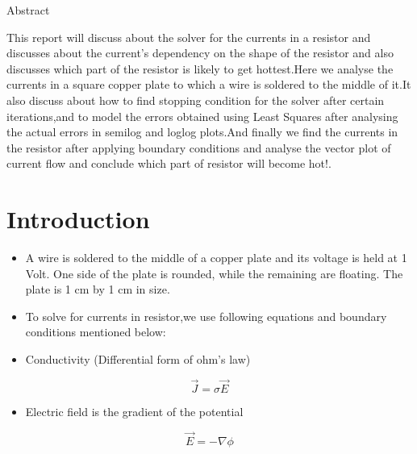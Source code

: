 \documentclass[11pt]{article}
\title{}
\author{
  \textbf{Name}: Rohithram R\\
  \textbf{Roll Number}: EE16B031
}
\providecommand{\tightlist}{%
      \setlength{\itemsep}{0pt}\setlength{\parskip}{0pt}}
\begin{document}
    
    
    \maketitle
    
    

    
	
		
    Abstract

 This report will discuss about the solver for the currents in a
resistor and discusses about the current's dependency on the shape of
the resistor and also discusses which part of the resistor is likely to
get hottest.Here we analyse the currents in a square copper plate to
which a wire is soldered to the middle of it.It also discuss about how
to find stopping condition for the solver after certain iterations,and
to model the errors obtained using Least Squares after analysing the
actual errors in semilog and loglog plots.And finally we find the
currents in the resistor after applying boundary conditions and analyse
the vector plot of current flow and conclude which part of resistor will
become hot!.

	

	
		
    \section{Introduction}\label{introduction}

\begin{itemize}
\tightlist
\item
  A wire is soldered to the middle of a copper plate and its voltage is
  held at 1 Volt. One side of the plate is rounded, while the remaining
  are floating. The plate is 1 cm by 1 cm in size.
\item
  To solve for currents in resistor,we use following equations and
  boundary conditions mentioned below:
\item
  Conductivity (Differential form of ohm's law)
\end{itemize}

\begin{equation}
\vec{J} = \sigma\vec{E}
   \end{equation}

\begin{itemize}
\tightlist
\item
  Electric field is the gradient of the potential
\end{itemize}

\begin{equation}
\vec{E} = -\nabla{\phi}
   \end{equation}
\end{document}
